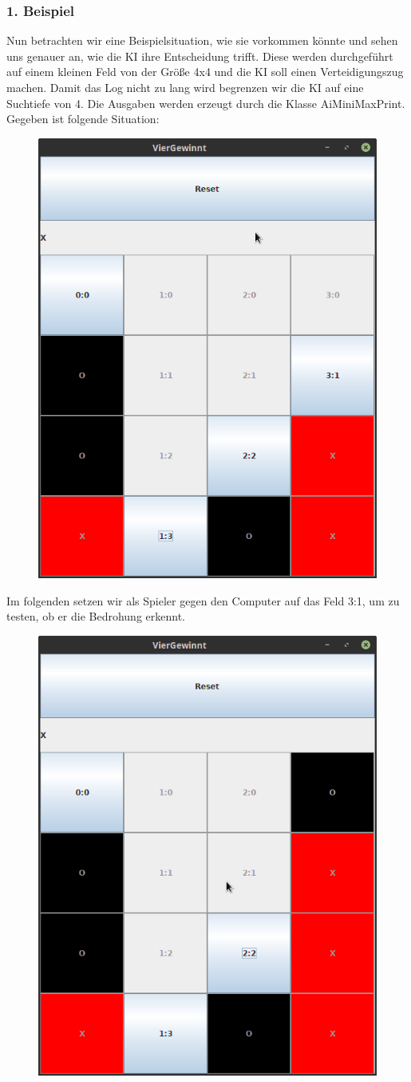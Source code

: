 \documentclass[12pt,a4paper,ngerman]{article}
\begin{document}
	\subsubsection{1. Beispiel}
	Nun betrachten wir eine Beispielsituation, wie sie vorkommen könnte und sehen uns genauer an, wie die KI ihre Entscheidung trifft. Diese werden durchgeführt auf einem kleinen Feld von der Größe 4x4 und die KI soll einen Verteidigungszug machen. Damit das Log nicht zu lang wird begrenzen wir die KI auf eine Suchtiefe von 4. Die Ausgaben werden erzeugt durch die Klasse AiMiniMaxPrint.
	Gegeben ist folgende Situation:
\begin{figure}[h]
	\centering
	\includegraphics[width=0.4\linewidth, height=0.3\textheight]{maybe/fach0}
	\caption{}
	\label{fig:fach0}
\end{figure}

	Im folgenden setzen wir als Spieler gegen den Computer auf das Feld 3:1, um zu testen, ob er die Bedrohung erkennt.
	
\begin{figure}[h]
	\centering
	\includegraphics[width=0.4\linewidth, height=0.3\textheight]{maybe/fach1}
	\caption{}
	\label{fig:fach1}
\end{figure}
\end{document}
